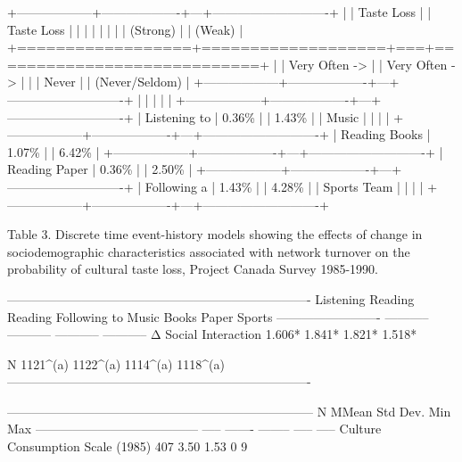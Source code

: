 +------------------+-------------------+---+----------------------------+ |                  | Taste Loss        |   | Taste Loss                 | |                  |                   |   |                            | |                  | (Strong)          |   | (Weak)                     | +==================+===================+===+============================+ |                  | Very Often ->     |   | Very Often ->              | |                  | Never             |   | (Never/Seldom)             | +------------------+-------------------+---+----------------------------+ |                  |                   |   |                            | +------------------+-------------------+---+----------------------------+ | Listening to     | 0.36\%             |   | 1.43\%                      | | Music            |                   |   |                            | +------------------+-------------------+---+----------------------------+ | Reading Books    | 1.07\%             |   | 6.42\%                      | +------------------+-------------------+---+----------------------------+ | Reading Paper    | 0.36\%             |   | 2.50\%                      | +------------------+-------------------+---+----------------------------+ | Following a      | 1.43\%             |   | 4.28\%                      | | Sports Team      |                   |   |                            | +------------------+-------------------+---+----------------------------+

Table 3. Discrete time event-history models showing the effects of change in sociodemographic characteristics associated with network turnover on the probability of cultural taste loss, Project Canada Survey 1985-1990.

-------------------------------------------------------------------------                             Listening   Reading     Reading     Following                             to Music    Books       Paper       Sports   ------------------------- ----------- ----------- ----------- -----------   Δ Social Interaction      1.606*      1.841*      1.821*      1.518*

N                         1121^(a)    1122^(a)    1114^(a)    1118^(a)   -------------------------------------------------------------------------

--------------------------------------------------------------------------                                           N     MMean   Std Dev. Min   Max   --------------------------------------- ----- ------- -------- ----- -----   Culture Consumption Scale (1985)        407   3.50    1.53     0     9


